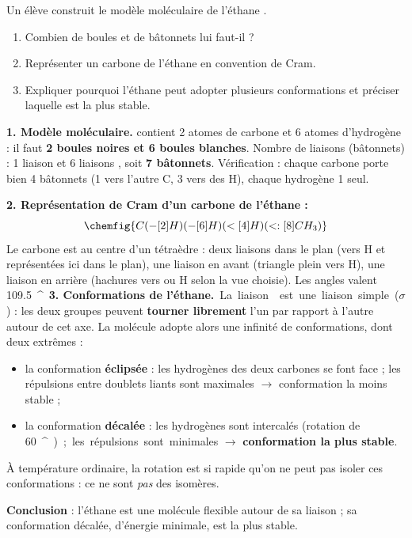 \documentclass[11pt]{article}
\providecommand{\degree}{^{\circ}}
\begin{document}
\begin{exoresolu}
Un élève construit le modèle moléculaire de l'éthane .
\begin{enumerate}
\item Combien de boules et de bâtonnets lui faut-il ?
\item Représenter un carbone de l'éthane en convention de Cram.
\item Expliquer pourquoi l'éthane peut adopter plusieurs conformations et préciser laquelle est la plus stable.
\end{enumerate}
\tcblower
\textbf{1. Modèle moléculaire.}  contient 2 atomes de carbone et 6 atomes d'hydrogène : il faut \textbf{2 boules noires et 6 boules blanches}. Nombre de liaisons (bâtonnets) : 1 liaison  et 6 liaisons , soit \textbf{7 bâtonnets}. Vérification : chaque carbone porte bien 4 bâtonnets (1 vers l'autre C, 3 vers des H), chaque hydrogène 1 seul.

\textbf{2. Représentation de Cram d'un carbone de l'éthane :}
\[ \chemfig{C(-[2]H)(-[6]H)(<[4]H)(<:[8]CH_3)} \]
Le carbone est au centre d'un tétraèdre : deux liaisons dans le plan (vers H et  représentées ici dans le plan), une liaison en avant (triangle plein vers H), une liaison en arrière (hachures vers  ou H selon la vue choisie). Les angles valent \SI{109,5}{\degree}.

\textbf{3. Conformations de l'éthane.} La liaison  est une liaison simple ($\sigma$) : les deux groupes  peuvent \textbf{tourner librement} l'un par rapport à l'autre autour de cet axe. La molécule adopte alors une infinité de conformations, dont deux extrêmes :
\begin{itemize}
\item la conformation \textbf{éclipsée} : les hydrogènes des deux carbones se font face ; les répulsions entre doublets liants sont maximales $\rightarrow$ conformation la moins stable ;
\item la conformation \textbf{décalée} : les hydrogènes sont intercalés (rotation de \SI{60}{\degree}) ; les répulsions sont minimales $\rightarrow$ \textbf{conformation la plus stable}.
\end{itemize}
À température ordinaire, la rotation est si rapide qu'on ne peut pas isoler ces conformations : ce ne sont \emph{pas} des isomères.

\textbf{Conclusion} : l'éthane est une molécule flexible autour de sa liaison  ; sa conformation décalée, d'énergie minimale, est la plus stable.
\end{exoresolu}
\end{document}
